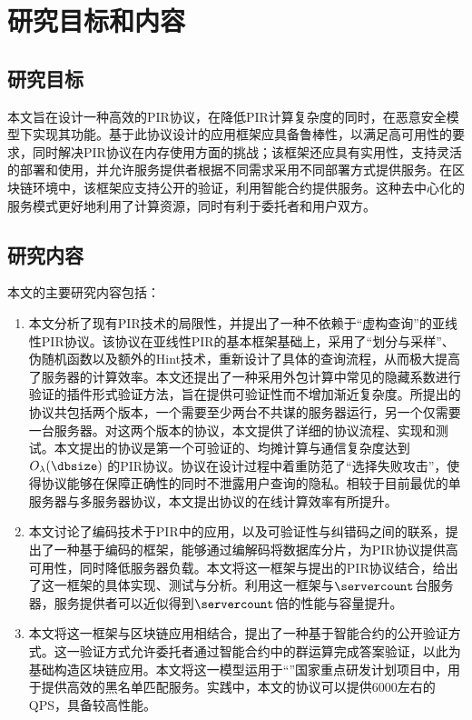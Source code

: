 \section{研究目标和内容}

\subsection{研究目标}
本文旨在设计一种高效的PIR协议，在降低PIR计算复杂度的同时，在恶意安全模型下实现其功能。基于此协议设计的应用框架应具备鲁棒性，以满足高可用性的要求，同时解决PIR协议在内存使用方面的挑战；该框架还应具有实用性，支持灵活的部署和使用，并允许服务提供者根据不同需求采用不同部署方式提供服务。在区块链环境中，该框架应支持公开的验证，利用智能合约提供服务。这种去中心化的服务模式更好地利用了计算资源，同时有利于委托者和用户双方。
\subsection{研究内容}

本文的主要研究内容包括：
\begin{enumerate}
    \item 本文分析了现有PIR技术的局限性，并提出了一种不依赖于“虚构查询”的亚线性PIR协议。该协议在亚线性PIR的基本框架\cite{EC:CorKog20}基础上，采用了“划分与采样”、伪随机函数以及额外的Hint技术，重新设计了具体的查询流程，从而极大提高了服务器的计算效率。本文还提出了一种采用外包计算中常见的隐藏系数进行验证的插件形式验证方法，旨在提供可验证性而不增加渐近复杂度。所提出的协议共包括两个版本，一个需要至少两台不共谋的服务器运行，另一个仅需要一台服务器。对这两个版本的协议，本文提供了详细的协议流程、实现和测试。本文提出的协议是第一个可验证的、均摊计算与通信复杂度达到 $O_\lambda(\dbsize)$ 的PIR协议。协议在设计过程中着重防范了“选择失败攻击”，使得协议能够在保障正确性的同时不泄露用户查询的隐私。相较于目前最优的单服务器与多服务器协议，本文提出协议的在线计算效率有所提升。
    \item 本文讨论了编码技术于PIR中的应用，以及可验证性与纠错码之间的联系，提出了一种基于编码的框架，能够通过编解码将数据库分片，为PIR协议提供高可用性，同时降低服务器负载。本文将这一框架与提出的PIR协议结合，给出了这一框架的具体实现、测试与分析。利用这一框架与$\servercount$台服务器，服务提供者可以近似得到$\servercount$倍的性能与容量提升。
    \item 本文将这一框架与区块链应用相结合，提出了一种基于智能合约的公开验证方式。这一验证方式允许委托者通过智能合约中的群运算完成答案验证，以此为基础构造区块链应用。本文将这一模型运用于“\projectname”国家重点研发计划项目中，用于提供高效的黑名单匹配服务。实践中，本文的协议可以提供6000左右的QPS，具备较高性能。
\end{enumerate}
